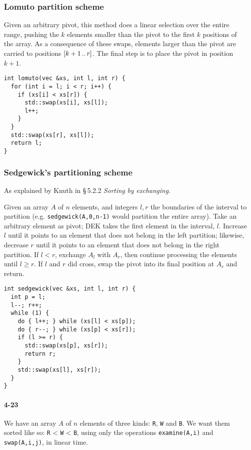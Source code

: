 \documentclass{report}
\newcommand{\li}{\lstinline}
\newcommand{\ldotsTwo}{%
 \mathinner{{\ldotp}{\ldotp}}%
}
\begin{document}
\subsubsection*{Lomuto partition scheme}
Given an arbitrary pivot, this method does a linear selection over the entire range, pushing the $k$ elements smaller than the pivot to the first $k$ positions of the array. As a consequence of these swaps, elements larger than the pivot are carried to positions $[k+1 \ldotsTwo r]$. The final step is to place the pivot in position $k+1$.

\begin{lstlisting}
int lomuto(vec &xs, int l, int r) {
  for (int i = l; i < r; i++) {
    if (xs[i] < xs[r]) {
      std::swap(xs[i], xs[l]);
      l++;
    }
  }
  std::swap(xs[r], xs[l]);
  return l;
}
\end{lstlisting}

\subsubsection*{Sedgewick's partitioning scheme}
As explained by Knuth in \S\,5.2.2 {\sl Sorting by exchanging\/}.

Given an array $A$ of $n$ elements, and integers $l, r$ the boundaries of the interval to partition (e.g. \lstinline!sedgewick(A,0,n-1)! would partition the entire array). Take an arbitrary element as pivot; DEK takes the first element in the interval, $l$. Increase $l$ until it points to an element that does not belong in the left partition; likewise, decrease $r$ until it points to an element that does not belong in the right partition. If $l<r$, exchange $A_l$ with $A_r$, then continue processing the elements until $l\geq r$. If $l$ and $r$ did cross, swap the pivot into its final position at $A_r$ and return.

\begin{lstlisting}
int sedgewick(vec &xs, int l, int r) {
  int p = l;
  l--; r++;
  while (1) {
    do { l++; } while (xs[l] < xs[p]);
    do { r--; } while (xs[p] < xs[r]);
    if (l >= r) {
      std::swap(xs[p], xs[r]);
      return r;
    }
    std::swap(xs[l], xs[r]);
  }
}
\end{lstlisting}

\paragraph{4-23} We have an array $A$ of $n$ elements of three kinds: \li!R!, \li!W! and \li!B!. We want them sorted like so: \li!R! < \li!W! < \li!B!, using only the operations \li!examine(A,i)! and \li!swap(A,i,j)!, in linear time.
\end{document}
